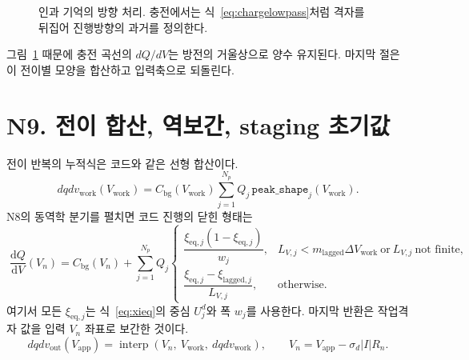 \documentclass[11pt,a4paper]{article}
\newcommand{\dd}{\mathrm{d}}
\newcommand{\eq}{\mathrm{eq}}
\newcommand{\app}{\mathrm{app}}
\newcommand{\bg}{\mathrm{bg}}
\newcommand{\work}{\mathrm{work}}
\newcommand{\lag}{\mathrm{lagged}}
\begin{document}
\begin{figure}[t]
\centering
{}
\caption{인과 기억의 방향 처리. 충전에서는 식~\eqref{eq:chargelowpass}처럼 격자를 뒤집어 진행방향의 과거를 정의한다.}
\label{fig:causaltail}
\end{figure}

그림~\ref{fig:causaltail} 때문에 충전 곡선의 $dQ/dV$는 방전의 거울상으로 양수 유지된다. 마지막 절은 이 전이별 모양을 합산하고 입력축으로 되돌린다.

\section{N9. 전이 합산, 역보간, staging 초기값}\label{sec:N9}
전이 반복의 누적식은 코드와 같은 선형 합산이다.
\begin{equation}
dqdv_{\work}(V_{\work})=
C_{\bg}(V_{\work})
\sum_{j=1}^{N_p}Q_j\,\texttt{peak\_shape}_j(V_{\work}).
\label{eq:dqdvwork}
\end{equation}
N8의 동역학 분기를 펼치면 코드 진행의 닫힌 형태는
\begin{equation}
\boxed{\;
\frac{\dd Q}{\dd V}(V_n)
=C_{\bg}(V_n)+
\sum_{j=1}^{N_p}Q_j
\begin{cases}
\dfrac{\xi_{\eq,j}(1-\xi_{\eq,j})}{w_j},
&L_{V,j}<m_{\lag}\Delta V_{\work}\ \text{or}\ L_{V,j}\ \text{not finite},\\[8pt]
\dfrac{\xi_{\eq,j}-\xi_{\lag,j}}{L_{V,j}},
&\text{otherwise}.
\end{cases}
\;}
\label{eq:masterv11}
\end{equation}
여기서 모든 $\xi_{\eq,j}$는 식~\eqref{eq:xieq}의 중심 $U_j^d$와 폭 $w_j$를 사용한다. 마지막 반환은 작업격자 값을 입력 $V_n$ 좌표로 보간한 것이다.
\begin{equation}
\boxed{\;dqdv_{\mathrm{out}}(V_{\app})=
\operatorname{interp}\!\left(V_n,\ V_{\work},\ dqdv_{\work}\right),
\qquad V_n=V_{\app}-\sigma_d|I|R_n.\;}
\label{eq:interpout}
\end{equation}
\end{document}
